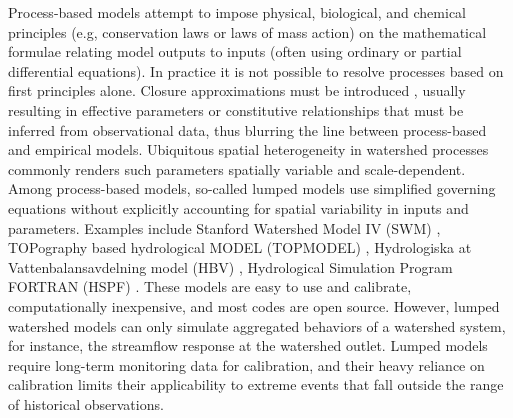 \documentclass[preprint,review, 12pt]{elsarticle}
\begin{document}
Process-based models attempt to impose physical, biological, and chemical principles (e.g, conservation laws or laws of mass action) on the mathematical formulae relating model outputs to inputs (often using ordinary or partial differential equations). In practice it is not possible to resolve processes based on first principles alone. Closure approximations must be introduced \citep{Wood2009}, usually resulting in effective parameters or constitutive relationships that must be inferred from observational data, thus blurring the line between process-based and empirical models. Ubiquitous spatial heterogeneity in watershed processes commonly renders such parameters spatially variable and scale-dependent. Among process-based models, so-called lumped models use simplified governing equations without explicitly accounting for spatial variability in inputs and parameters. Examples  include Stanford Watershed Model IV (SWM) \citep{Crawford1966}, TOPography based hydrological MODEL (TOPMODEL) \citep{Beven1997}, Hydrologiska at Vattenbalansavdelning model (HBV) \citep{Bergstrom1976}, Hydrological Simulation Program FORTRAN (HSPF) \citep{Development, Duda2012}. These models are easy to use and calibrate, computationally inexpensive, and most codes are open source. However, lumped watershed models can only simulate aggregated behaviors of a watershed system, for instance, the streamflow response at the watershed outlet. Lumped models require long-term monitoring data for calibration, and their heavy reliance on calibration limits their applicability to extreme events that fall outside the range of historical observations. 
\end{document}
